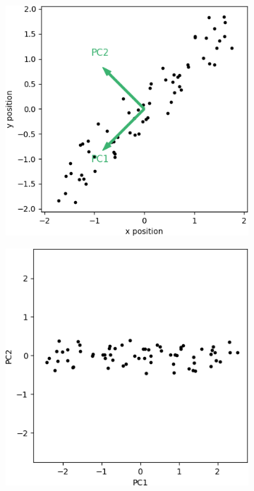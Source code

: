 \begin{figure}
	\centering
	\begin{subfigure}{0.45\linewidth}
		\includegraphics[width=\textwidth]{figs/some_nice_data_pc}
		\caption{}
		\label{fig:some_nice_data_pc}
	\end{subfigure}
	\hfill
	\begin{subfigure}{0.45\linewidth}
		\includegraphics[width=\textwidth]{figs/some_nice_data_pca}
		\caption{}
		\label{fig:some_nice_data_pca}
	\end{subfigure}
	

\end{figure}
